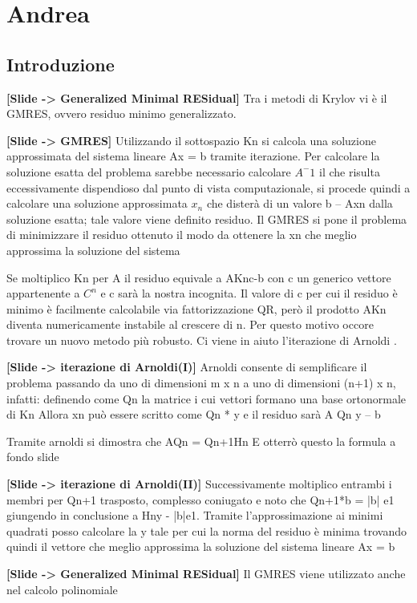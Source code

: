 \documentclass[a4paper]{article}
\begin{document}
\section*{Andrea}
\subsection*{Introduzione}

\textbf{[Slide -> Generalized Minimal RESidual]}
Tra i metodi di Krylov vi è il GMRES, ovvero residuo minimo generalizzato. 

\textbf{[Slide -> GMRES]}
Utilizzando il sottospazio Kn si calcola una soluzione approssimata del sistema lineare Ax = b tramite iterazione.
Per calcolare la soluzione esatta del problema sarebbe necessario calcolare $A^-1$ il che risulta eccessivamente dispendioso dal punto di vista computazionale, si procede quindi a calcolare una soluzione approssimata $x_n$ che disterà di un valore b – Axn dalla soluzione esatta; tale valore viene definito residuo. Il GMRES si pone il problema di minimizzare il residuo ottenuto il modo da ottenere la xn che meglio approssima la soluzione del sistema

Se moltiplico Kn per A il residuo equivale a AKnc-b con c un generico vettore appartenente a $C^n$ e c sarà la nostra incognita.
Il valore di c per cui il residuo è minimo è facilmente calcolabile via fattorizzazione QR, però il prodotto AKn diventa numericamente instabile al crescere di n. Per questo motivo occore trovare un nuovo metodo più robusto.
Ci viene in aiuto l’iterazione di Arnoldi .

\textbf{[Slide -> iterazione di Arnoldi(I)]}
Arnoldi consente di semplificare il problema passando da uno di dimensioni m x n a uno di dimensioni (n+1) x n, infatti: definendo come Qn la matrice i cui vettori formano una base ortonormale di Kn
Allora xn può essere scritto come Qn * y e il residuo sarà A Qn y – b

Tramite arnoldi si dimostra che AQn = Qn+1Hn
E otterrò questo la formula a fondo slide

\textbf{[Slide -> iterazione di Arnoldi(II)]}
Successivamente moltiplico entrambi i membri per Qn+1 trasposto, complesso coniugato e noto che Qn+1*b = |b| e1 giungendo in conclusione a Hny - |b|e1. 
Tramite l’approssimazione ai minimi quadrati posso calcolare la y tale per cui la norma del residuo è minima trovando quindi il vettore che meglio approssima la soluzione del sistema lineare Ax = b

\textbf{[Slide -> Generalized Minimal RESidual]}
Il GMRES viene utilizzato anche nel calcolo polinomiale
\end{document}
